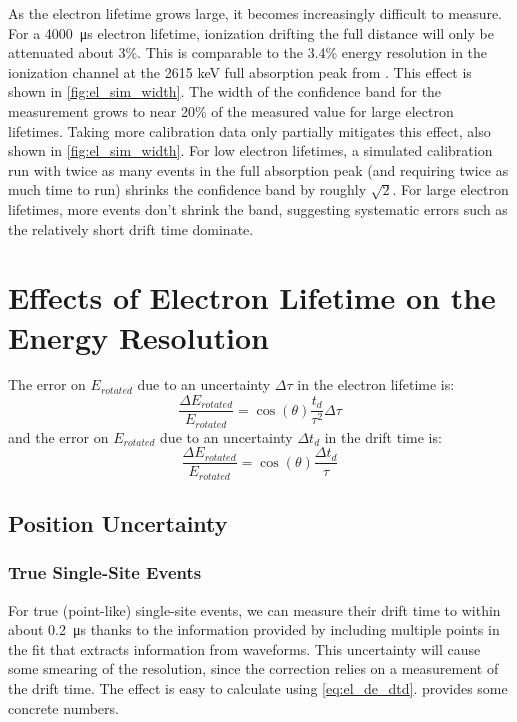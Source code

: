 \documentclass[herrin-thesis.tex]{subfiles}
\begin{document}
As the electron lifetime grows large, it becomes increasingly difficult to measure. For a \SI{4000}{\micro\second} electron lifetime, ionization drifting the full distance will only be attenuated about 3\%. This is comparable to the 3.4\% energy resolution in the ionization channel at the 2615 keV full absorption peak from . This effect is shown in \cref{fig:el_sim_width}. The width of the confidence band for the measurement grows to near 20\% of the measured value for large electron lifetimes. Taking more calibration data only partially mitigates this effect, also shown in \cref{fig:el_sim_width}. For low electron lifetimes, a simulated calibration run with twice as many events in the full absorption peak (and requiring twice as much time to run) shrinks the confidence band by roughly \(\sqrt{2}\). For large electron lifetimes, more events don't shrink the band, suggesting systematic errors such as the relatively short drift time dominate.

\section{Effects of Electron Lifetime on the Energy Resolution}

The error on \(E_{rotated}\) due to an uncertainty \(\Delta\tau\) in the electron lifetime is:
\begin{equation}
\frac{\Delta E_{rotated}}{E_{rotated}} = \cos(\theta) \frac{t_d}{\tau^2}\Delta\tau
\label{eq:el_de_dtau}
\end{equation}
and the error on \(E_{rotated}\) due to an uncertainty \(\Delta t_d\) in the drift time is:
\begin{equation}
\frac{\Delta E_{rotated}}{E_{rotated}} = \cos(\theta) \frac{\Delta t_d}{\tau}
\label{eq:el_de_dtd}
\end{equation}

\subsection{Position Uncertainty}
\subsubsection{True Single-Site Events}
For true (point-like) single-site events, we can measure their drift time to within about \SI{0.2}{\micro\second} thanks to the information provided by including multiple points in the fit that extracts information from waveforms. This uncertainty will cause some smearing of the resolution, since the correction relies on a measurement of the drift time. The effect is easy to calculate using \cref{eq:el_de_dtd}.  provides some concrete numbers.
\end{document}
